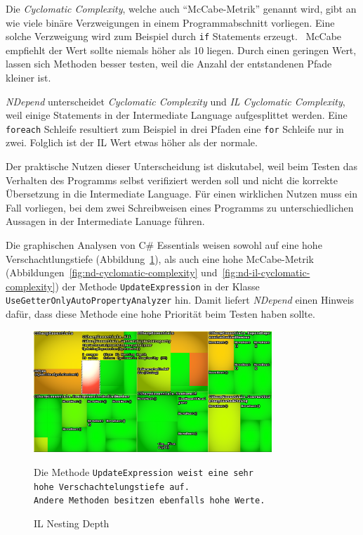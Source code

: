 Die \emph{Cyclomatic Complexity}, welche auch \enquote{McCabe-Metrik} genannt wird, gibt an wie viele binäre Verzweigungen in einem Programmabschnitt vorliegen. Eine solche Verzweigung wird zum Beispiel durch \texttt{if} Statements erzeugt.~\cite{mccabe} McCabe empfiehlt der Wert sollte niemals höher als 10 liegen. Durch einen geringen Wert, lassen sich Methoden besser testen, weil die Anzahl der entstandenen Pfade kleiner ist.

\emph{NDepend} unterscheidet \emph{Cyclomatic Complexity} und \emph{IL Cyclomatic Complexity}, weil einige Statements in der Intermediate Language aufgesplittet werden. Eine \texttt{foreach} Schleife resultiert zum Beispiel in drei Pfaden eine \texttt{for} Schleife nur in zwei. Folglich ist der IL Wert etwas höher als der normale.

Der praktische Nutzen dieser Unterscheidung ist diskutabel, weil beim Testen das Verhalten des Programms selbst verifiziert werden soll und nicht die korrekte Übersetzung in die Intermediate Language. Für einen wirklichen Nutzen muss ein Fall vorliegen, bei dem zwei Schreibweisen eines Programms zu unterschiedlichen Aussagen in der Intermediate Lanuage führen.

Die graphischen Analysen von C\# Essentials weisen sowohl auf eine hohe Verschachtlungstiefe (Abbildung~\ref{fig:nd-il-nesting-depth}), als auch eine hohe McCabe-Metrik (Abbildungen~\ref{fig:nd-cyclomatic-complexity} und~\ref{fig:nd-il-cyclomatic-complexity}) der Methode \texttt{UpdateExpression} in der Klasse \texttt{UseGetterOnlyAutoPropertyAnalyzer} hin. Damit liefert \emph{NDepend} einen Hinweis dafür, dass diese Methode eine hohe Priorität beim Testen haben sollte.

\begin{figure}[!ht]
	\centering
	\includegraphics[width=0.8\textwidth]{images/nd-il-nesting-depth.png}
	\caption{IL Nesting Depth}
	\vspace{0.1cm}
	\label{fig:nd-il-nesting-depth}
	Die Methode \texttt{UpdateExpression weist eine sehr \\ hohe Verschachtelungstiefe auf. \\ Andere Methoden besitzen ebenfalls hohe Werte.}
\end{figure}

